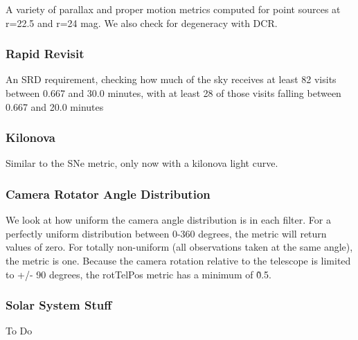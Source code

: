A variety of parallax and proper motion metrics computed for point sources at r=22.5 and r=24 mag. We also check for degeneracy with DCR.

\subsubsection{Rapid Revisit}

An SRD requirement, checking how much of the sky receives at least 82 visits between 0.667 and 30.0 minutes, with at least 28 of those visits falling between 0.667 and 20.0 minutes


\subsubsection{Kilonova}

Similar to the SNe metric, only now with a kilonova light curve.

\subsubsection{Camera Rotator Angle Distribution}

We look at how uniform the camera angle distribution is in each filter. For a perfectly uniform distribution between 0-360 degrees, the metric will return values of zero. For totally non-uniform (all observations taken at the same angle), the metric is one.  Because the camera rotation relative to the telescope is limited to +/- 90 degrees, the rotTelPos metric has a minimum of \~0.5. 



\subsubsection{Solar System Stuff}

To Do





